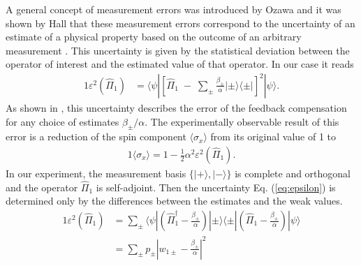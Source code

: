 \documentclass[english,keywords,aps,twocolumn]{revtex4-1}
\begin{document}
A general concept of measurement errors was introduced by Ozawa \cite{Ozawa03} and it was shown by Hall that these measurement errors correspond to the uncertainty of an estimate of a physical property based on the outcome of an arbitrary measurement \cite{Hall04}. This uncertainty is given by the statistical deviation between the operator of interest and the estimated value of that operator. In our case it reads
\begin{alignat}{1}
  \varepsilon^2(\hat \Pi_1) &= \langle\psi| 
\left[ \hat\Pi_1 \; - \; \sum_\pm \frac{\beta_\pm}\alpha |\pm\rangle\langle\pm|   \right]^2 
|\psi\rangle. \label{eq:epsilon}
\end{alignat}
As shown in \cite{Hofmann21}, this uncertainty describes the error of the feedback compensation for any choice of estimates $\beta_{\pm}/\alpha$. The experimentally observable result of this error is a reduction of the spin component $\langle\sigma_x\rangle$ from its original value of 1 to
\begin{alignat}{1}
 \langle\sigma_x\rangle=1 - \frac 1 2 \alpha^2 \varepsilon^2(\hat \Pi_1).\label{eq:maxsigmax}
\end{alignat}
In our experiment, the measurement basis $\{|+\rangle,|-\rangle\}$ is complete and orthogonal and the operator $\hat\Pi_1$ is self-adjoint. Then the uncertainty Eq. (\ref{eq:epsilon}) is determined only by the differences between the estimates and the weak values.
\begin{alignat}{1}
\varepsilon^2(\hat \Pi_1)
&= \sum_\pm \langle\psi| \left(\hat\Pi_1^\dagger - \frac{\beta_\pm}\alpha \right)|\pm\rangle\langle\pm |\left(\hat\Pi_1 - \frac{\beta_\pm}\alpha \right)|\psi\rangle\nonumber\\
  &= \sum_\pm p_\pm %
  \left|w_{1\pm} - \frac{\beta_\pm}\alpha \right|^2 \label{eq:uncertainty}
\end{alignat}
\end{document}
